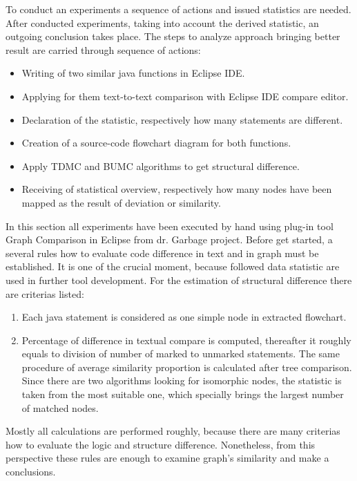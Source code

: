 \documentclass{report}
\begin{document}
To conduct an experiments a sequence of actions and issued statistics are needed. After conducted experiments, taking into account the derived statistic, an outgoing conclusion takes place. The steps to analyze approach bringing better result are carried through sequence of actions:
\begin{itemize}
	\item Writing of two similar java functions in Eclipse IDE.
	\item Applying for them text-to-text comparison with Eclipse IDE compare editor.
	\item Declaration of the statistic, respectively how many statements are different.
	\item Creation of a source-code flowchart diagram for both functions.
	\item Apply TDMC and BUMC algorithms to get structural difference.
	\item Receiving of statistical overview, respectively how many nodes have been  mapped as the result of deviation or similarity.
\end{itemize}

In this section all experiments have been executed by hand using plug-in tool Graph Comparison in Eclipse from dr. Garbage project. Before get started, a several rules how to evaluate code difference in text and in graph must be established. It is one of the crucial moment, because followed data statistic are used in further tool development. For the estimation of structural difference there are criterias listed:
\begin{enumerate}
	\item Each java statement is considered as one simple node in extracted flowchart.
	\item Percentage of difference in textual compare is computed, thereafter it roughly equals to division of number of marked to unmarked statements. The same procedure of average similarity proportion is calculated after tree comparison. Since there are two algorithms looking for isomorphic nodes, the statistic is taken from the most suitable one, which specially brings the largest number of matched nodes.
\end{enumerate}

Mostly all calculations are performed roughly, because there are many criterias how to evaluate the logic and structure difference. Nonetheless, from this perspective these rules are enough to examine graph's similarity and make a conclusions.
\end{document}
